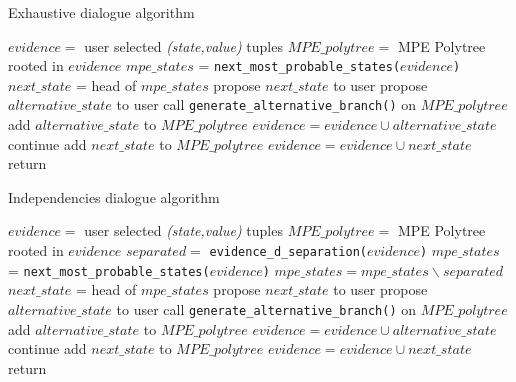 \begin{algorithm}[htp!]
	\caption{Exhaustive dialogue algorithm}
	\label{alg:pseudo-mpe-exhaustive}
	\begin{algorithmic}[1]
		\State $evidence = $ user selected \textit{(state,value)} tuples
		\State $MPE\_polytree = $ MPE Polytree rooted in $evidence$
			\State $mpe\_states$ = \texttt{next\_most\_probable\_states($evidence$)}
				\State $next\_state$ = head of $mpe\_states$ 
				\State propose $next\_state$ to user 
						\State propose $alternative\_state$ to user 
							\State call \texttt{generate\_alternative\_branch()} on $MPE\_polytree$ 
							\State add $alternative\_state$ to $MPE\_polytree$
							\State $evidence = evidence \cup alternative\_state$
						\Else
							\State continue
						\EndIf
					\EndFor
				\Else
					\State add $next\_state$ to $MPE\_polytree$
					\State $evidence = evidence \cup next\_state$
				\EndIf
			\Else 
				\State return
			\EndIf
		\EndWhile
	\end{algorithmic}
\end{algorithm} 

\begin{algorithm}[htp!]
	\caption{Independencies dialogue algorithm}
	\label{alg:pseudo-mpe-independencies}
	\begin{algorithmic}[1]
		\State $evidence = $ user selected \textit{(state,value)} tuples
		\State $MPE\_polytree = $ MPE Polytree rooted in $evidence$
			\State $separated = $ \texttt{evidence\_d\_separation($evidence$)} 
			\State $mpe\_states$ = \texttt{next\_most\_probable\_states($evidence$)}
			\State $mpe\_states = mpe\_states \smallsetminus separated$ 
				\State $next\_state$ = head of $mpe\_states$ 
				\State propose $next\_state$ to user 
						\State propose $alternative\_state$ to user 
							\State call \texttt{generate\_alternative\_branch()} on $MPE\_polytree$ 
							\State add $alternative\_state$ to $MPE\_polytree$
							\State $evidence = evidence \cup alternative\_state$
						\Else
							\State continue 
						\EndIf
					\EndFor
				\Else
					\State add $next\_state$ to $MPE\_polytree$
					\State $evidence = evidence \cup next\_state$
				\EndIf
			\Else 
				\State return 
			\EndIf
		\EndWhile
	\end{algorithmic}
\end{algorithm} 

